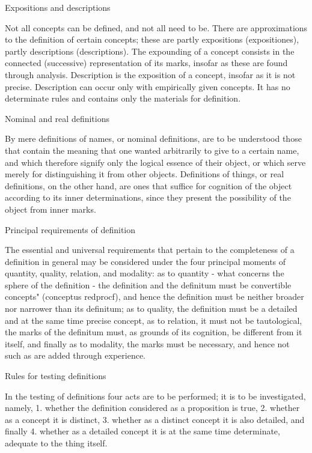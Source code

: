     Expositions and descriptions

    Not all concepts can be defined, and not all need to be.
    There are approximations to the definition of certain concepts;
    these are partly expositions (expositiones), partly descriptions (descriptions).
    The expounding of a concept consists in the connected (successive)
    representation of its marks, insofar as these are found through analysis.
    Description is the exposition of a concept, insofar as it is not precise.
    Description can occur only with empirically given concepts.
    It has no determinate rules and contains only the materials for definition.

    Nominal and real definitions

    By mere definitions of names, or nominal definitions, are to be understood
    those that contain the meaning that one wanted arbitrarily to give to a
    certain name, and which therefore signify only the logical essence of their
    object, or which serve merely for distinguishing it from other objects.
    Definitions of things, or real definitions, on the other hand, are ones that
    suffice for cognition of the object according to its inner determinations,
    since they present the possibility of the object from inner marks.

    Principal requirements of definition

    The essential and universal requirements that pertain to the completeness
    of a definition in general may be considered under the four principal
    moments of quantity, quality, relation, and modality:
    as to quantity - what concerns the sphere of the definition - the definition
    and the definitum must be convertible concepts" (conceptus redprocf), and hence
    the definition must be neither broader nor narrower than its definitum;
    as to quality, the definition must be
    a detailed and at the same time precise concept,
    as to relation, it must not be tautological,
    the marks of the definitum must, as grounds of its cognition,
    be different from it itself, and finally
    as to modality, the marks must be necessary, and
    hence not such as are added through experience.

    Rules for testing definitions

    In the testing of definitions four acts are to be performed;
    it is to be investigated, namely,
    1. whether the definition considered as a proposition is true,
    2. whether as a concept it is distinct,
    3. whether as a distinct concept it is also detailed, and finally
    4. whether as a detailed concept it is at the same time determinate,
       adequate to the thing itself.

